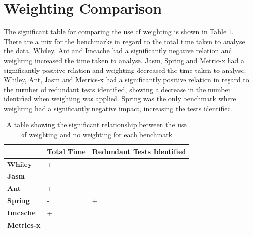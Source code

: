 \section{Weighting Comparison}

The significant table for comparing the use of weighting is shown in Table \ref{weightingsig}. There are a mix for the benchmarks in regard to the total time taken to analyse the data. Whiley, Ant and Imcache had a significantly negative relation and weighting increased the time taken to analyse. Jasm, Spring and Metric-x had a significantly positive relation and weighting decreased the time taken to analyse. Whiley, Ant, Jasm and Metrics-x had a significantly positive relation in regard to the number of redundant tests identified, showing a decrease in the number identified when weighting was applied. Spring was the only benchmark where weighting had a significantly negative impact, increasing the tests identified.

\begin{table}[H]
\centering

\label{weightingsig}
\begin{tabular}{|l|l|l|}
\hline
{\bf }          & {\bf Total Time} & {\bf Redundant Tests Identified} \\ \hline
{\bf Whiley}    & +                & -                           \\ \hline
{\bf Jasm}      & -                & -                           \\ \hline
{\bf Ant}       & +                & -                           \\ \hline
{\bf Spring}    & -                & +                           \\ \hline
{\bf Imcache}   & +                & =                           \\ \hline
{\bf Metrics-x} & -                & -                           \\ \hline
\end{tabular}
\caption{A table showing the significant relationship between the use of weighting and no weighting for each benchmark}
\end{table}


